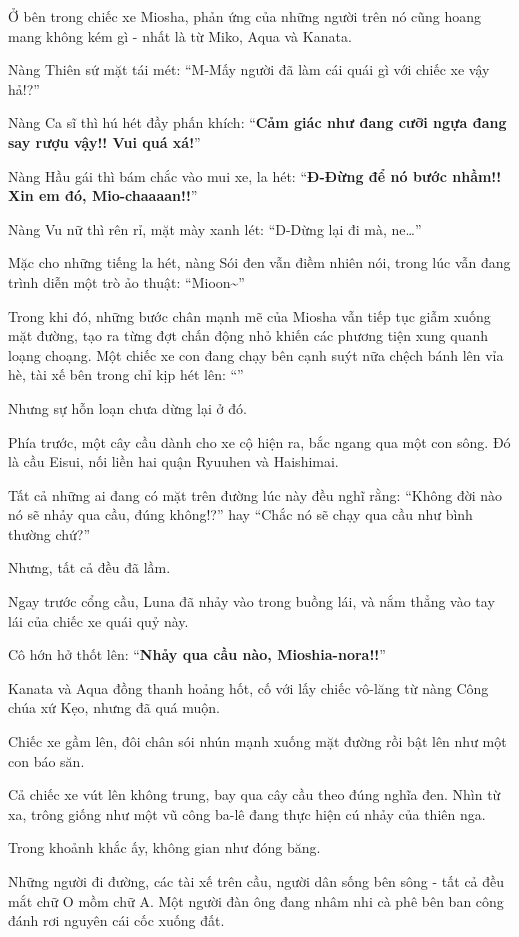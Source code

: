\documentclass[../main.tex]{subfiles}
\begin{document}
Ở bên trong chiếc xe Miosha, phản ứng của những người trên nó cũng hoang mang không kém gì - nhất là từ Miko, Aqua và Kanata.

Nàng Thiên sứ mặt tái mét: ``M-Mấy người đã làm cái quái gì với chiếc xe vậy hả!?''

Nàng Ca sĩ thì hú hét đầy phấn khích: ``\textbf{Cảm giác như đang cưỡi ngựa đang say rượu vậy!! Vui quá xá!}''

Nàng Hầu gái thì bám chắc vào mui xe, la hét: ``\textbf{Đ-Đừng để nó bước nhầm!! Xin em đó, Mio-chaaaan!!}''

Nàng Vu nữ thì rên rỉ, mặt mày xanh lét: ``D-Dừng lại đi mà, ne\dots''

Mặc cho những tiếng la hét, nàng Sói đen vẫn điềm nhiên nói, trong lúc vẫn đang trình diễn một trò ảo thuật: ``Mioon\~{}''

Trong khi đó, những bước chân mạnh mẽ của Miosha vẫn tiếp tục giẫm xuống mặt đường, tạo ra từng đợt chấn động nhỏ khiến các phương tiện xung quanh loạng choạng. Một chiếc xe con đang chạy bên cạnh suýt nữa chệch bánh lên vỉa hè, tài xế bên trong chỉ kịp hét lên: ``\textbf{}''

Nhưng sự hỗn loạn chưa dừng lại ở đó.

Phía trước, một cây cầu dành cho xe cộ hiện ra, bắc ngang qua một con sông. Đó là cầu Eisui, nối liền hai quận Ryuuhen và Haishimai.

Tất cả những ai đang có mặt trên đường lúc này đều nghĩ rằng: ``Không đời nào nó sẽ nhảy qua cầu, đúng không!?'' hay ``Chắc nó sẽ chạy qua cầu như bình thường chứ?''

Nhưng, tất cả đều đã lầm.

Ngay trước cổng cầu, Luna đã nhảy vào trong buồng lái, và nắm thẳng vào tay lái của chiếc xe quái quỷ này.

Cô hớn hở thốt lên: ``\textbf{Nhảy qua cầu nào, Mioshia-nora!!}''

Kanata và Aqua đồng thanh hoảng hốt, cố với lấy chiếc vô-lăng từ nàng Công chúa xứ Kẹo, nhưng đã quá muộn.

Chiếc xe gầm lên, đôi chân sói nhún mạnh xuống mặt đường rồi bật lên như một con báo săn.

Cả chiếc xe vút lên không trung, bay qua cây cầu theo đúng nghĩa đen. Nhìn từ xa, trông giống như một vũ công ba-lê đang thực hiện cú nhảy của thiên nga.

Trong khoảnh khắc ấy, không gian như đóng băng.

Những người đi đường, các tài xế trên cầu, người dân sống bên sông - tất cả đều mắt chữ O mồm chữ A. Một người đàn ông đang nhâm nhi cà phê bên ban công đánh rơi nguyên cái cốc xuống đất.
\end{document}
